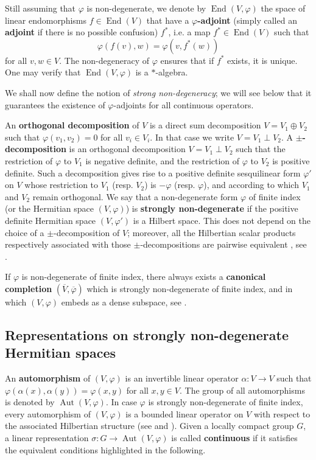 \documentclass[12pt,a4paper]{amsproc}
\theoremstyle{definition}
\DeclareMathOperator{\Aut}{Aut}
\DeclareMathOperator{\End}{End}
\begin{document}
 
Still assuming that $\varphi$ is non-degenerate, we denote by $\End(V, \varphi)$ the space of linear endomorphisms $f \in \End(V)$   that have a \textbf{$\varphi$-adjoint} (simply called an \textbf{adjoint} if there is no possible confusion) $f^*$, i.e. a map $f^* \in \End(V)$ such that 
$$\varphi(f(v), w) = \varphi(v, f^*(w))$$
for all $v, w \in V$. The non-degeneracy of $\varphi$ ensures that if $f^*$ exists, it is unique. One may verify that $\End(V, \varphi)$ is a $*$-algebra. 

We shall now define the notion of \textit{strong non-degeneracy}; we will see below that it guarantees the existence of $\varphi$-adjoints for all continuous operators. 

An \textbf{orthogonal decomposition} of $V$ is a direct sum decomposition $V = V_1 \oplus V_2$ such that $\varphi(v_1, v_2) =0$ for all $v_i \in V_i$. In that case we write $V = V_1 \perp V_2$. A \textbf{$\pm$-decomposition} is an orthogonal decomposition $V = V_1 \perp V_2$ such that the restriction of $\varphi$ to $V_1$ is negative definite, and the restriction of $\varphi$ to $V_2$ is positive definite. Such a decomposition gives rise to a positive definite sesquilinear form $\varphi'$ on $V$  whose restriction to $V_1$ (resp. $V_2$) is $- \varphi$ (resp. $ \varphi$), and according to which $V_1$ and $V_2$ remain orthogonal. We say that a non-degenerate form $\varphi$ of finite index (or the Hermitian space $(V, \varphi)$) is \textbf{strongly non-degenerate} if the positive definite Hermitian space $(V, \varphi')$ is a Hilbert space. This does not depend on the choice of a $\pm$-decomposition of $V$; moreover,  all the Hilbertian scalar products respectively associated with those $\pm$-decompositions  are pairwise equivalent , see \cite[Lemma~2.4]{BIM}. 


If $\varphi$ is non-degenerate of finite index, there always exists a \textbf{canonical completion} $(\overline V, \overline \varphi)$ which is strongly non-degenerate of finite index, and in which $(V, \varphi)$ embeds as a dense subspace, see \cite[Proposition~3.9]{MoPy2}.
 
 \subsection{Representations on strongly non-degenerate Hermitian spaces}
 
An \textbf{automorphism} of $(V, \varphi)$ is an invertible linear operator $\alpha \colon V \to V$ such that $\varphi(\alpha(x), \alpha(y)) = \varphi(x, y)$ for all $x, y \in V$. The group of all automorphisms is denoted by $\Aut(V, \varphi)$. In case $\varphi$ is strongly non-degenerate of finite index, every automorphism of $(V, \varphi)$ is a bounded linear operator on $V$ with respect to the associated Hilbertian structure (see \cite[\S2]{BIM} and \cite[Proposition~ 9.7]{DuchesnePhD}). 
Given a locally compact group $G$, a linear representation $\sigma \colon G \to \Aut(V, \varphi)$ is called \textbf{continuous} if it satisfies the equivalent conditions highlighted in the following. 
\end{document}
